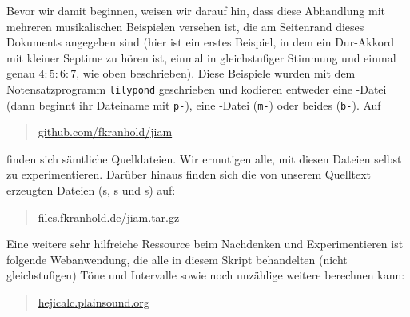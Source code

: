 
Bevor wir damit beginnen, weisen wir darauf hin, dass diese Abhandlung mit
mehreren musikalischen Beispielen versehen ist, die am Seitenrand dieses
Dokuments angegeben sind (hier ist ein erstes Beispiel, in dem ein
Dur-Akkord mit kleiner Septime zu hören ist, einmal in gleichstufiger Stimmung
und einmal genau \mbox{$4:5:6:7$}, wie oben beschrieben). Diese Beispiele wurden
mit dem Notensatzprogramm \verb!lilypond! geschrieben und kodieren entweder eine
-Datei (dann beginnt ihr Dateiname mit \verb!p-!), eine
-Datei (\verb!m-!) oder beides (\verb!b-!). Auf
\begin{quote}
  \href{https://github.com/fkranhold/jiam/}{\textsf{github.com/fkranhold/jiam}}
\end{quote}
finden sich sämtliche Quelldateien.  Wir ermutigen alle, mit diesen Dateien
selbst zu experimentieren. Darüber hinaus finden sich die von unserem Quelltext
erzeugten Dateien (s, s und s) auf:
\begin{quote}
  \href{https://files.fkranhold.de/jiam.tar.gz}{\textsf{files.fkranhold.de/jiam.tar.gz}}
\end{quote}
Eine weitere sehr hilfreiche Ressource beim Nachdenken und Experimentieren ist
folgende Webanwendung, die alle in diesem Skript behandelten (nicht
gleichstufigen) Töne und Intervalle sowie noch unzählige weitere berechnen kann:
\begin{quote}
	\href{https://hejicalc.plainsound.org/}{\textsf{hejicalc.plainsound.org}}
\end{quote}


